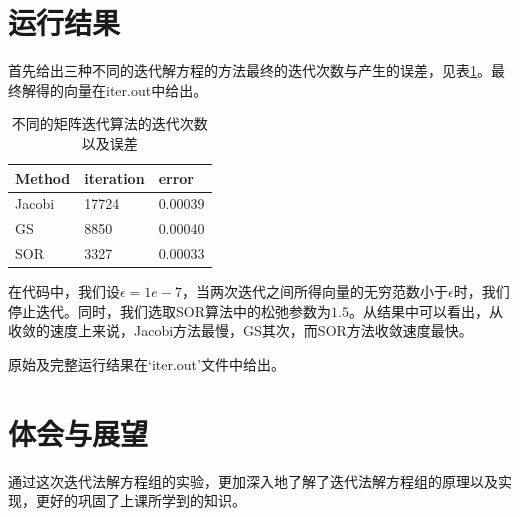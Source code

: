 \documentclass{article}
\theoremstyle{plain}
\theoremstyle{definition}
\theoremstyle{remark}
\begin{document}
    \section{运行结果}
    首先给出三种不同的迭代解方程的方法最终的迭代次数与产生的误差，见表\ref{res}。最终解得的向量在iter.out中给出。
    \begin{table}
        \centering
        \begin{tabular}{|l|l|l|}
        \hline\hline
        Method     & iteration & error     \\ \hline
        Jacobi     & 17724     & 0.00039   \\
        GS         & 8850      & 0.00040   \\
        SOR        & 3327      & 0.00033   \\ \hline
        \end{tabular}
        \caption{不同的矩阵迭代算法的迭代次数以及误差}
        \label{res}
    \end{table}

    在代码中，我们设$\epsilon = 1e-7$，当两次迭代之间所得向量的无穷范数小于$\epsilon$时，我们停止迭代。同时，我们选取SOR算法中的松弛参数为$1.5$。从结果中可以看出，从收敛的速度上来说，Jacobi方法最慢，GS其次，而SOR方法收敛速度最快。
    
    原始及完整运行结果在`iter.out'文件中给出。
        
    \section{体会与展望}
    通过这次迭代法解方程组的实验，更加深入地了解了迭代法解方程组的原理以及实现，更好的巩固了上课所学到的知识。
    
\end{document}
